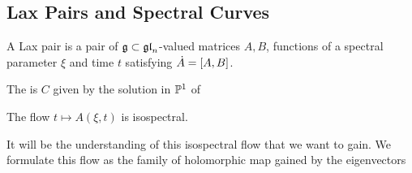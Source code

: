 \documentclass{article}
\begin{document}
\subsection{Lax Pairs and Spectral Curves}
\begin{definition}
	A Lax pair is a pair of $\mf{g}\subset\mf{gl}_n$-valued matrices $A,B$, functions of a spectral parameter $\xi$ and time $t$ satisfying $\dot{A} = \comm[A]{B}$. 
\end{definition}

\begin{definition}
	The  is $C$ given by the solution in $\mbb{P}^1$ of 
\end{definition}

\begin{prop}
	The flow $t \mapsto A(\xi,t)$ is isospectral.
\end{prop}

It will be the understanding of this isospectral flow that we want to gain. We formulate this flow as the family of holomorphic map gained by the eigenvectors 



\end{document}
